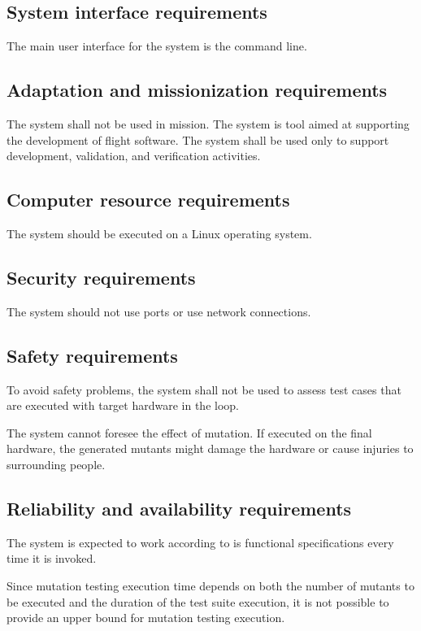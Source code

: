 \subsection{System interface requirements}

\RQ{} The main user interface for the system is the command line.

\subsection{Adaptation and missionization requirements }

\RQ{} The system shall not be used in mission. The system is tool aimed at supporting the development of flight software. The system shall be used only to support development, validation, and verification activities. 

\subsection{Computer resource requirements}

\RQ{} The system should be executed on a Linux operating system.

\subsection{Security requirements }

\RQ{} The system should not use ports or use network connections.

\subsection{Safety requirements}

\RQ{} To avoid safety problems, the system shall not be used to assess test cases that are executed with target hardware in the loop.

\RQ{} The system cannot foresee the effect of mutation. If executed on the final hardware, the generated mutants might damage the hardware or cause injuries to surrounding people.

\subsection{Reliability and availability requirements}

\RQ{} The system is expected to work according to is functional specifications every time it is invoked.

\RQ{} Since mutation testing execution time depends on both the number of mutants to be executed and the duration of the test suite execution, it is not possible to provide an upper bound for mutation testing execution.


